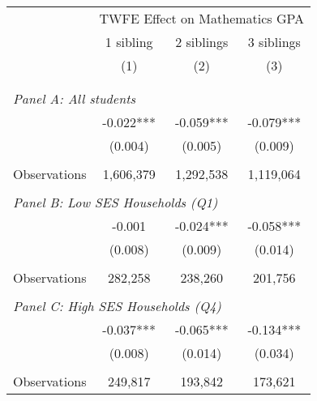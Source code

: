 \makeatletter
{}
{
\makeatother
\begin{tabular}{lccc}
\toprule
\cmidrule(lr){2-4}
& \multicolumn{3}{c}{TWFE Effect on Mathematics GPA} \\
\cmidrule(lr){2-4}
& 1 sibling & 2 siblings & 3 siblings  \\
\cmidrule(lr){2-2} \cmidrule(lr){3-3} \cmidrule(lr){4-4}
& (1) & (2) & (3)\\
\bottomrule
&  &  &  \\
&  &  &   \\
\multicolumn{4}{l}{\textit{Panel A: All students}} \\
\hspace{3mm}        &      -0.022***&      -0.059***&      -0.079***\\
                    &     (0.004)   &     (0.005)   &     (0.009)   \\
                    &               &               &               \\
\hspace{3mm}Observations&   1,606,379   &   1,292,538   &   1,119,064   \\
 
&  &  &   \\
\multicolumn{4}{l}{\textit{Panel B: Low SES Households (Q1)}} \\
\hspace{3mm}        &      -0.001   &      -0.024***&      -0.058***\\
                    &     (0.008)   &     (0.009)   &     (0.014)   \\
                    &               &               &               \\
\hspace{3mm}Observations&     282,258   &     238,260   &     201,756   \\
 
&  &  &   \\
\multicolumn{4}{l}{\textit{Panel C: High SES Households (Q4)}} \\
\hspace{3mm}        &      -0.037***&      -0.065***&      -0.134***\\
                    &     (0.008)   &     (0.014)   &     (0.034)   \\
                    &               &               &               \\
\hspace{3mm}Observations&     249,817   &     193,842   &     173,621   \\
 

\end{tabular}}
